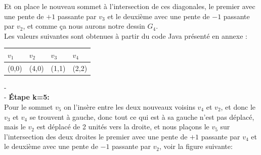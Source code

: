 \documentclass[hidelinks,letterpaper,12pt]{article}
\begin{document}
Et on place le nouveau sommet à l'intersection de ces diagonales, le premier avec une pente de $+1$ passante par $v_3$ et le deuxième avec une pente de $-1$ passante par $v_2$, et comme ça nous aurons notre dessin $G_4$.
\\
Les valeurs suivantes sont obtenues à partir du code Java présenté en annexe :
\\
\begin{tabularx}{\textwidth}{|*{4}{X|}}
\hline
$v_1$ & $v_2$ & $v_3$ & $v_4$ \\
\hline
(0,0) & (4,0) & (1,1) & (2,2) \\
\hline
\end{tabularx}
{\color{white}-}
\\
{\color{white}-}
\textbf{Étape k=5:}
\\
Pour le sommet $v_5$ on l'insère entre les deux nouveaux voisins $v_4$ et $v_2$, et donc le $v_3$ et $v_4$ se trouvent à gauche, donc tout ce qui est à sa gauche n'est pas déplacé, mais le $v_2$ est déplacé de 2 unités vers la droite, et nous plaçons le $v_5$ sur l'intersection des deux droites le premier avec une pente de $+1$ passante par $v_4$ et le deuxième avec une pente de $-1$ passante par $v_2$, voir la figure suivante:
\begin{figure}[H]
\centering
{}
\label{Diagramme}	
\end{figure}
\end{document}
